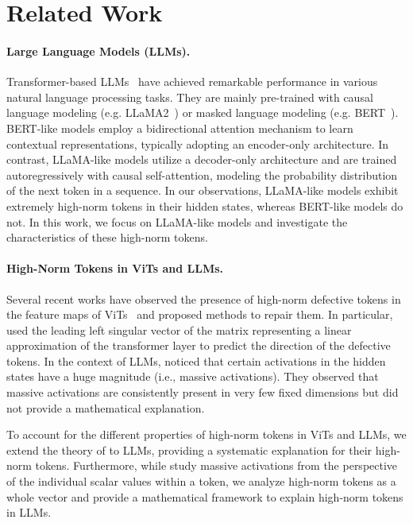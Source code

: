 \section{Related Work}\label{sec:related}

\paragraph{Large Language Models (LLMs).}

Transformer-based LLMs~\cite{minaee2024large} have achieved remarkable performance in various natural language processing tasks.
They are mainly pre-trained with causal language modeling (e.g. LLaMA2~\cite{touvron2023llama}) or masked language modeling (e.g. BERT~\cite{devlin-etal-2019-bert}).
BERT-like models employ a bidirectional attention mechanism to learn contextual representations, typically adopting an encoder-only architecture.
In contrast, LLaMA-like models utilize a decoder-only architecture and are trained autoregressively with causal self-attention, modeling the probability distribution of the next token in a sequence.
In our observations, LLaMA-like models exhibit extremely high-norm tokens in their hidden states, whereas BERT-like models do not.
In this work, we focus on LLaMA-like models and investigate the characteristics of these high-norm tokens.

\paragraph{High-Norm Tokens in ViTs and LLMs.}

Several recent works have observed the presence of high-norm defective tokens in the feature maps of ViTs~\cite{darcetvision,wang2024sinder} and proposed methods to repair them.
In particular, \citet{wang2024sinder} used the leading left singular vector of the matrix representing a linear approximation of the transformer layer to predict the direction of the defective tokens.
In the context of LLMs, \citet{sun2024massive} noticed that certain activations in the hidden states have a huge magnitude (i.e., massive activations).
They observed that massive activations are consistently present in very few fixed dimensions but did not provide a mathematical explanation.

To account for the different properties of high-norm tokens in ViTs and LLMs, we extend the theory of \citet{wang2024sinder} to LLMs, providing a systematic explanation for their high-norm tokens.
Furthermore, while \citet{sun2024massive} study massive activations from the perspective of the individual scalar values within a token, we analyze high-norm tokens as a whole vector and provide a mathematical framework to explain high-norm tokens in LLMs.

